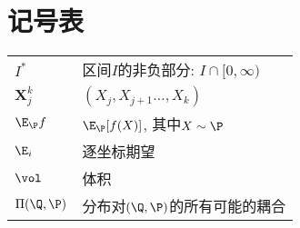 \section*{记号表}

\begin{tabular}{p{} p{}}
\hline
	$I^*$ & 区间$I$的非负部分: $I \cap [0, \infty)$ \\
	$\bm X_j^k$ & $(X_j, X_{j+1} \dots, X_k)$ \\
	$\E_{\P} f$ & $\E_{\P} [f(X)]$, 其中$X \sim \P$ \\
	$\E_i$ & 逐坐标期望 \\
	$\vol$ & 体积 \\
	$\Pi(\Q, \P)$ & 分布对$(\Q, \P)$的所有可能的耦合
\end{tabular}
